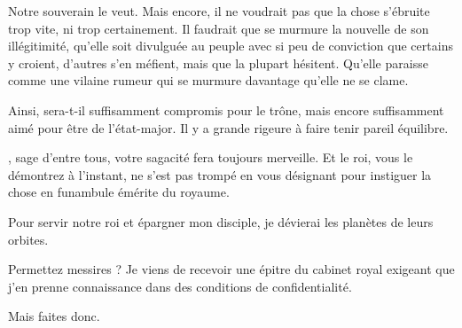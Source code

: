 \begin{drama}
  \generalspeaks Notre souverain le veut. Mais encore, il ne voudrait pas que la chose s’ébruite trop vite, ni trop certainement. Il faudrait que se murmure la nouvelle de son illégitimité, qu’elle soit divulguée au peuple avec si peu de conviction que certains y croient, d’autres s’en méfient, mais que la plupart hésitent. Qu’elle paraisse comme une vilaine rumeur qui se murmure davantage qu’elle ne se clame.

  \alexasspeaks Ainsi,  sera-t-il suffisamment compromis pour le trône, mais encore suffisamment aimé pour être de l’état-major. Il y a grande rigeure à faire tenir pareil équilibre.

  \generalspeaks \alexas, sage d’entre tous, votre sagacité fera toujours merveille. Et le roi, vous le démontrez à l’instant, ne s’est pas trompé en  vous désignant pour instiguer la chose en funambule émérite du royaume.

  \alexasspeaks Pour servir notre roi et épargner mon disciple, je dévierai les planètes de leurs orbites.


  \alexasspeaks Permettez messires ? Je viens de recevoir une épitre du cabinet royal exigeant que  j’en prenne connaissance dans des conditions de confidentialité.

  \generalspeaks Mais faites donc.
\end{drama}

\scene

\StageDirII{\elena, \general}


